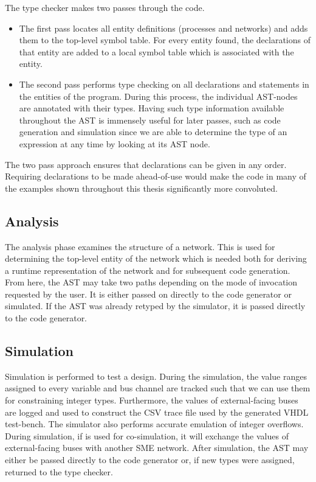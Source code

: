 The type checker makes two passes through the code.
\begin{itemize}
\item The first pass locates all entity definitions (processes and networks) and
  adds them to the top-level symbol table. For every entity found, the
  declarations of that entity are added to a local symbol table which is
  associated with the entity.
\item The second pass performs type checking on all declarations and statements
  in the entities of the program. During this process, the individual AST-nodes
  are annotated with their types.  Having
  such type information available throughout the AST is immensely useful for
  later passes, such as code generation and simulation since we are able to
  determine the type of an expression at any time by looking at its AST node.

\end{itemize}

The two pass approach ensures that declarations can be given in any
order. Requiring declarations to be made ahead-of-use would make the code in
many of the examples shown throughout this thesis significantly more convoluted.
  
\subsection{Analysis} The analysis phase examines the structure of a network.
This is used for determining the top-level entity of the network which is needed
both for deriving a runtime representation of the network and for subsequent
code generation. From here, the AST may take two paths depending on the mode of
invocation requested by the user. It is either passed on directly to the code
generator or simulated. If the AST was already retyped by the simulator, it is
passed directly to the code generator.

\subsection{Simulation}
Simulation is performed to test a design. During the simulation, the value
ranges assigned to every variable and bus channel are tracked such that we can
use them for constraining integer types. Furthermore, the values of
external-facing buses are logged and used to construct the CSV trace file used
by the generated VHDL test-bench.  The simulator also performs accurate emulation of integer
overflows. During simulation, if \libsme{} is used for co-simulation, it will
exchange the values of external-facing buses with another SME network. After
simulation, the AST may either be passed directly to the code generator or, if
new types were assigned, returned to the type checker.

